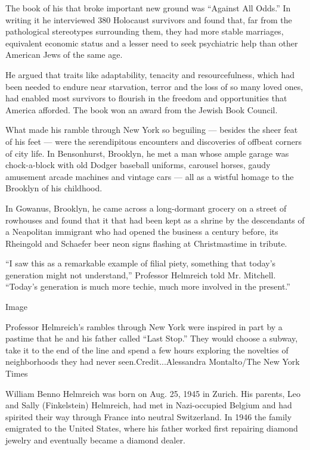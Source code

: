 The book of his that broke important new ground was ``Against All
Odds.'' In writing it he interviewed 380 Holocaust survivors and found
that, far from the pathological stereotypes surrounding them, they had
more stable marriages, equivalent economic status and a lesser need to
seek psychiatric help than other American Jews of the same age.

He argued that traits like adaptability, tenacity and resourcefulness,
which had been needed to endure near starvation, terror and the loss of
so many loved ones, had enabled most survivors to flourish in the
freedom and opportunities that America afforded. The book won an award
from the Jewish Book Council.

What made his ramble through New York so beguiling --- besides the sheer
feat of his feet --- were the serendipitous encounters and discoveries
of offbeat corners of city life. In Bensonhurst, Brooklyn, he met a man
whose ample garage was chock-a-block with old Dodger baseball uniforms,
carousel horses, gaudy amusement arcade machines and vintage cars ---
all as a wistful homage to the Brooklyn of his childhood.

In Gowanus, Brooklyn, he came across a long-dormant grocery on a street
of rowhouses and found that it that had been kept as a shrine by the
descendants of a Neapolitan immigrant who had opened the business a
century before, its Rheingold and Schaefer beer neon signs flashing at
Christmastime in tribute.

``I saw this as a remarkable example of filial piety, something that
today's generation might not understand,'' Professor Helmreich told Mr.
Mitchell. ``Today's generation is much more techie, much more involved
in the present.''

Image

Professor Helmreich's rambles through New York were inspired in part by
a pastime that he and his father called ``Last Stop.'' They would choose
a subway, take it to the end of the line and spend a few hours exploring
the novelties of neighborhoods they had never seen.Credit...Alessandra
Montalto/The New York Times

William Benno Helmreich was born on Aug. 25, 1945 in Zurich. His
parents, Leo and Sally (Finkelstein) Helmreich, had met in Nazi-occupied
Belgium and had spirited their way through France into neutral
Switzerland. In 1946 the family emigrated to the United States, where
his father worked first repairing diamond jewelry and eventually became
a diamond dealer.

